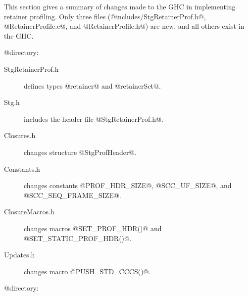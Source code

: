 \documentclass{article}
\begin{document}
This section gives a summary of changes made to the GHC in 
implementing retainer profiling.
Only three files (@includes/StgRetainerProf.h@, @RetainerProfile.c@, and 
@RetainerProfile.h@) are new, and all others exist in the GHC.

@ directory:

\begin{description}
\item[StgRetainerProf.h] defines types @retainer@ and @retainerSet@. 
\item[Stg.h] includes the header file @StgRetainerProf.h@.
\item[Closures.h] changes structure @StgProfHeader@.
\item[Constants.h] changes constants @PROF_HDR_SIZE@, @SCC_UF_SIZE@, and
  @SCC_SEQ_FRAME_SIZE@.
\item[ClosureMacros.h] changes macros @SET_PROF_HDR()@ and 
  @SET_STATIC_PROF_HDR()@.
\item[Updates.h] changes macro @PUSH_STD_CCCS()@.
\end{description}

@\rts@ directory:
\end{document}
